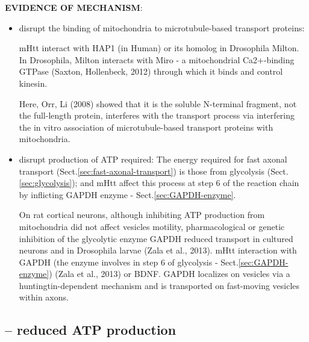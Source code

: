 {\bf EVIDENCE OF MECHANISM}:
\begin{itemize}

  \item disrupt the binding of mitochondria to microtubule-based transport
  proteins:
  
  mHtt interact with HAP1 (in Human) or its homolog in Drosophila Milton. In
  Drosophila, Milton interacts with Miro - a mitochondrial Ca2+-binding GTPase
  (Saxton, Hollenbeck, 2012) through which it binds and control kinesin.
   
   Here, Orr, Li (2008) showed that it is the soluble N-terminal fragment, not
   the full-length protein, interferes with the transport process via
   interfering the in vitro association of microtubule-based transport proteins
   with mitochondria.
  
  \item disrupt production of ATP required:  The energy required for fast axonal
  transport (Sect.\ref{sec:fast-axonal-transport}) is those from glycolysis
  (Sect.\ref{sec:glycolysis}); and mHtt affect this process at step 6 of the
  reaction chain by inflicting GAPDH enzyme - Sect.\ref{sec:GAPDH-enzyme}.
  
  On rat cortical neurons, although inhibiting ATP production from mitochondria
  did not affect vesicles motility, pharmacological or genetic inhibition of the
  glycolytic enzyme GAPDH reduced transport in cultured neurons and in
  Drosophila larvae (Zala et al., 2013). mHtt interaction with GAPDH (the enzyme
  involves in step 6 of glycolysis - Sect.\ref{sec:GAPDH-enzyme}) (Zala et al.,
  2013) or BDNF.
  GAPDH localizes on vesicles via a huntingtin-dependent mechanism and is
  transported on fast-moving vesicles within axons.

  
\end{itemize}



\subsection{-- reduced ATP production}

